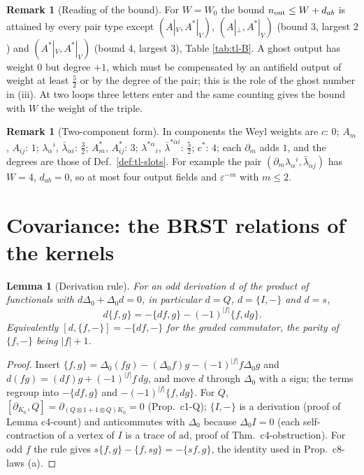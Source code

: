 \documentclass[11pt]{article}
\numberwithin{equation}{section}
\theoremstyle{plain}
\newtheorem{lemma}[theorem]{Lemma}
\theoremstyle{definition}
\newtheorem{remark}[theorem]{Remark}
\begin{document}
\begin{remark}[Reading of the bound]
For $W=W_0$ the bound $n_{\rm out}\le W+d_{ab}$ is attained by every pair type except $(A|_V,A^*|_V)$, $(A|_\perp,A^*|_V)$ (bound $3$, largest $2$) and $(A^*|_V,A^*|_V)$ (bound $4$, largest $3$), Table \ref{tab:tl-B}. A ghost output has weight $0$ but degree $+1$, which must be compensated by an antifield output of weight at least $\tfrac52$ or by the degree of the pair; this is the role of the ghost number in (iii). At two loops three letters enter and the same counting gives the bound with $W$ the weight of the triple.
\end{remark}


\begin{remark}[Two-component form]
In components the Weyl weights are $c$: $0$; $A_m$, $A_{ij}$: $1$; $\lambda_\alpha{}^i$, $\bar\lambda_{\dot\alpha i}$: $\tfrac32$; $A^*_m$, $A^*_{ij}$: $3$; $\lambda^{*\alpha}{}_i$, $\bar\lambda^{*\dot\alpha i}$: $\tfrac52$; $c^*$: $4$; each $\partial_m$ adds $1$, and the degrees are those of Def.~\ref{def:tl-slots}. For example the pair $(\partial_m\lambda_\alpha{}^i,\bar\lambda_{\dot\alpha j})$ has $W=4$, $d_{ab}=0$, so at most four output fields and $\varepsilon^{-m}$ with $m\le2$.
\end{remark}

\section{Covariance: the BRST relations of the kernels}
\label{sec:tl-cov}

\begin{lemma}[Derivation rule]
\label{lem:tl-deriv}
For an odd derivation $d$ of the product of functionals with $d\Delta_0+\Delta_0d=0$, in particular $d=Q$, $d=\{I,-\}$ and $d=s$,
\[
d\{f,g\}=-\{df,g\}-(-1)^{|f|}\{f,dg\}.
\]
Equivalently $[d,\{f,-\}]=-\{df,-\}$ for the graded commutator, the parity of $\{f,-\}$ being $|f|+1$.
\end{lemma}

\begin{proof}
Insert $\{f,g\}=\Delta_0(fg)-(\Delta_0f)g-(-1)^{|f|}f\Delta_0g$ and $d(fg)=(df)g+(-1)^{|f|}f\,dg$, and move $d$ through $\Delta_0$ with a sign; the terms regroup into $-\{df,g\}$ and $-(-1)^{|f|}\{f,dg\}$. For $Q$, $[\partial_{K_0},Q]=\partial_{(Q\otimes1+1\otimes Q)K_0}=0$ (Prop.~c1-Q); $\{I,-\}$ is a derivation (proof of Lemma c4-count) and anticommutes with $\Delta_0$ because $\Delta_0I=0$ (each self-contraction of a vertex of $I$ is a trace of $\mathrm{ad}$, proof of Thm.~c4-obstruction). For odd $f$ the rule gives $s\{f,g\}-\{f,sg\}=-\{sf,g\}$, the identity used in Prop.~c8-laws (a).
\end{proof}
\end{document}
